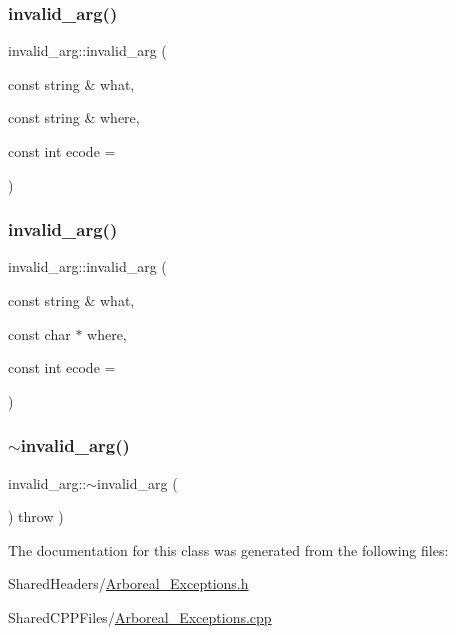 \subsubsection{\texorpdfstring{invalid\+\_\+arg()}{invalid\_arg()}\hspace{0.1cm}{\footnotesize\ttfamily [3/4]}}
{\footnotesize\ttfamily invalid\+\_\+arg\+::invalid\+\_\+arg (\begin{DoxyParamCaption}\item[{const string \&}]{what,  }\item[{const string \&}]{where,  }\item[{const int}]{ecode = {} }\end{DoxyParamCaption})}

\mbox{\label{classinvalid__arg_a1b68c46a8c2ddc202eb89edf05667618}} 
\subsubsection{\texorpdfstring{invalid\+\_\+arg()}{invalid\_arg()}\hspace{0.1cm}{\footnotesize\ttfamily [4/4]}}
{\footnotesize\ttfamily invalid\+\_\+arg\+::invalid\+\_\+arg (\begin{DoxyParamCaption}\item[{const string \&}]{what,  }\item[{const char $\ast$}]{where,  }\item[{const int}]{ecode = {} }\end{DoxyParamCaption})}

\mbox{\label{classinvalid__arg_ac45ee5e85c700baa425fd431e350e938}} 
\subsubsection{\texorpdfstring{$\sim$invalid\+\_\+arg()}{~invalid\_arg()}}
{\footnotesize\ttfamily invalid\+\_\+arg\+::$\sim$invalid\+\_\+arg (\begin{DoxyParamCaption}{ }\end{DoxyParamCaption}) throw  ) }



The documentation for this class was generated from the following files\+:\begin{DoxyCompactItemize}
\item 
Shared\+Headers/\mbox{\hyperlink{_arboreal___exceptions_8h}{Arboreal\+\_\+\+Exceptions.\+h}}\item 
Shared\+C\+P\+P\+Files/\mbox{\hyperlink{_arboreal___exceptions_8cpp}{Arboreal\+\_\+\+Exceptions.\+cpp}}\end{DoxyCompactItemize}
